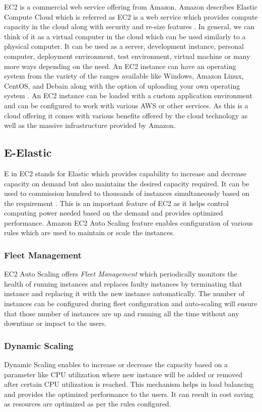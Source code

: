 EC2 is a commercial web service offering from Amazon. Amazon describes Elastic Compute Cloud which is referred as EC2 is a web service which provides compute capacity in the cloud along with security and re-size features \cite{hid-sp18-402-www-aws-ec2}. In general, we can think of it as a virtual computer in the cloud which can be used similarly to a physical computer. It can be used as a server, development instance, personal computer, deployment environment, test environment, virtual machine or many more ways depending on the need. An EC2 instance can have an operating system from the variety of the ranges available like Windows, Amazon Linux, CentOS, and Debain along with the option of uploading your own operating system \cite{hid-sp18-402-www-aws-ec2-details}. An EC2 instance can be loaded with a custom application environment and can be configured to work with various AWS or other services. As this is a cloud offering it comes with various benefits offered by the cloud technology as well as the massive infrastructure provided by Amazon.

\subsection{E-Elastic}
E in EC2 stands for Elastic which provides capability to increase and decrease capacity on demand but also maintains the desired capacity required. It can be used to commission hundred to thousands of instances simultaneously based on the requirement \cite{hid-sp18-402-www-aws-ec2}. This is an important feature of EC2 as it helps control computing power needed based on the demand and provides optimized performance. 
Amazon EC2 Auto Scaling \cite{hid-sp18-402-www-aws-ec2autoscaling} feature enables configuration of various rules which are used to maintain or scale the instances. 
\subsubsection{Fleet Management}
EC2 Auto Scaling offers \emph{Fleet Management} which periodically monitors the health of running instances and replaces faulty instances by terminating that instance and replacing it with the new instance automatically. The number of instances can be configured during fleet configuration and auto-scaling will ensure that those number of instances are up and running all the time without any downtime or impact to the users.
\subsubsection{Dynamic Scaling}
Dynamic Scaling enables to increase or decrease the capacity based on a parameter like CPU utilization where new instance will be added or removed after certain CPU utilization is reached. This mechanism helps in load balancing and provides the optimized performance to the users. It can result in cost saving as resources are optimized as per the rules configured.

